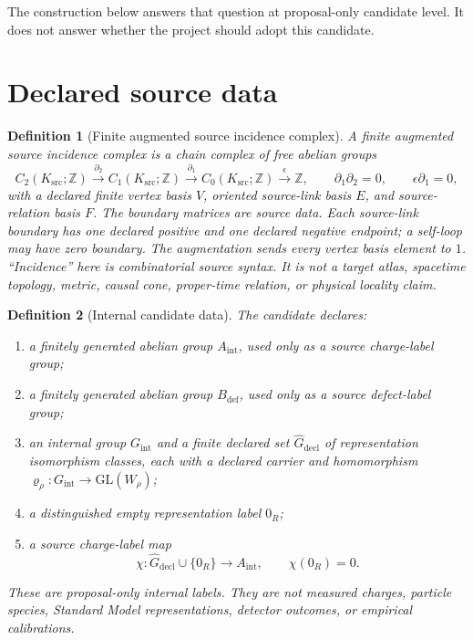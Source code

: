 \documentclass[11pt]{article}
\newtheorem{definition}{Definition}
\newcommand{\Ksrc}{K_{\mathrm{src}}}
\newcommand{\Aint}{A_{\mathrm{int}}}
\newcommand{\Bdef}{B_{\mathrm{def}}}
\newcommand{\Gint}{G_{\mathrm{int}}}
\newcommand{\Rdecl}{\widehat G_{\mathrm{decl}}}
\begin{document}
The construction below answers that question at proposal-only candidate
level. It does not answer whether the project should adopt this candidate.

\section{Declared source data}

\begin{definition}[Finite augmented source incidence complex]
A finite augmented source incidence complex is a chain complex of free
abelian groups
\[
 C_2(\Ksrc;\mathbb Z)
 \xrightarrow{\partial_2}
 C_1(\Ksrc;\mathbb Z)
 \xrightarrow{\partial_1}
 C_0(\Ksrc;\mathbb Z)
 \xrightarrow{\epsilon}
 \mathbb Z,
 \qquad
 \partial_1\partial_2=0,
 \qquad
 \epsilon\partial_1=0,
\]
with a declared finite vertex basis \(V\), oriented source-link basis \(E\),
and source-relation basis \(F\). The boundary matrices are source data.
Each source-link boundary has one declared positive and one declared negative
endpoint; a self-loop may have zero boundary. The augmentation sends every
vertex basis element to \(1\).
``Incidence'' here is combinatorial source syntax. It is not a target atlas,
spacetime topology, metric, causal cone, proper-time relation, or physical
locality claim.
\end{definition}

\begin{definition}[Internal candidate data]
The candidate declares:
\begin{enumerate}[leftmargin=*]
\item a finitely generated abelian group
  \(\Aint\), used only as a source charge-label group;
\item a finitely generated abelian group
  \(\Bdef\), used only as a source defect-label group;
\item an internal group \(\Gint\) and a finite declared set
  \(\Rdecl\) of representation isomorphism classes, each with a declared
  carrier and homomorphism
  \(\varrho_\rho:\Gint\to\mathrm{GL}(W_\rho)\);
\item a distinguished empty representation label \(0_R\);
\item a source charge-label map
  \[
    \chi:\Rdecl\cup\{0_R\}\longrightarrow\Aint,
    \qquad \chi(0_R)=0.
  \]
\end{enumerate}
These are proposal-only internal labels. They are not measured charges,
particle species, Standard Model representations, detector outcomes, or
empirical calibrations.
\end{definition}
\end{document}
